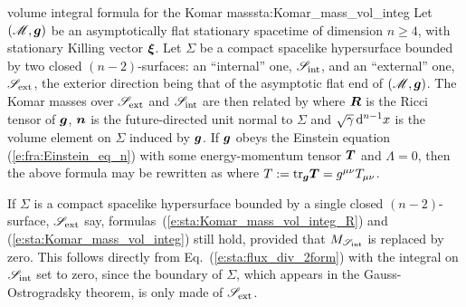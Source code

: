 \begin{tprop}{volume integral formula for the Komar mass}{sta:Komar_mass_vol_integ}
Let $(\mathscr{M}, \bm{g})$ be an asymptotically flat stationary spacetime of dimension $n\geq 4$,
with stationary Killing vector $\bm{\xi}$.
Let $\Sigma$ be a compact spacelike hypersurface bounded by two closed $(n-2)$-surfaces:
an ``internal'' one, $\mathscr{S}_{\rm int}$, and an ``external'' one,
$\mathscr{S}_{\rm ext}$, the exterior direction being that of the asymptotic flat end of $(\mathscr{M}, \bm{g})$.
The Komar masses over $\mathscr{S}_{\rm ext}$ and $\mathscr{S}_{\rm int}$ are then
related by
\be \label{e:sta:Komar_mass_vol_integ_R}
\ee
where $\bm{R}$ is the Ricci tensor of $\bm{g}$,
$\bm{n}$ is the future-directed unit normal to $\Sigma$
and $\sqrt{\gamma}\,\mathrm{d}^{n-1} x$ is the volume element on $\Sigma$
induced by $\bm{g}$.
If $\bm{g}$ obeys the Einstein equation (\ref{e:fra:Einstein_eq_n}) with some energy-momentum
tensor $\bm{T}$ and $\Lambda=0$, then
the above formula may be rewritten as
\be \label{e:sta:Komar_mass_vol_integ}
\ee
where $T:= \mathrm{tr}_{\bm{g}} \bm{T} = g^{\mu\nu} T_{\mu\nu}$.
\end{tprop}

\begin{remark}
\label{r:sta:Komar_mass_single_boundary}
If $\Sigma$ is a compact spacelike hypersurface bounded by a single closed
$(n-2)$-surface, $\mathscr{S}_{\rm ext}$ say, formulas~(\ref{e:sta:Komar_mass_vol_integ_R}) and (\ref{e:sta:Komar_mass_vol_integ})
still hold, provided that $M_{\mathscr{S}_{\rm int}}$ is replaced by zero. This follows
directly from Eq.~(\ref{e:sta:flux_div_2form}) with the integral on $\mathscr{S}_{\rm int}$
set to zero, since the boundary of $\Sigma$, which appears in the
Gauss-Ostrogradsky theorem, is only made of $\mathscr{S}_{\rm ext}$.
\end{remark}

